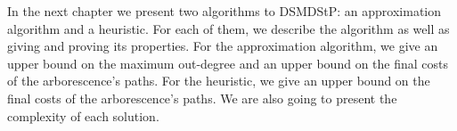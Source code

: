 In the next chapter we present two algorithms to DSMDStP: an approximation algorithm and a heuristic. For each of them, we 
describe the algorithm as well as giving and proving its properties. For the approximation algorithm, we give an upper bound on the 
maximum out-degree and an upper bound on the final costs of the arborescence's paths. For the heuristic, we give an upper bound 
on the final costs of the arborescence's paths. We are also going to present the complexity of each solution.
